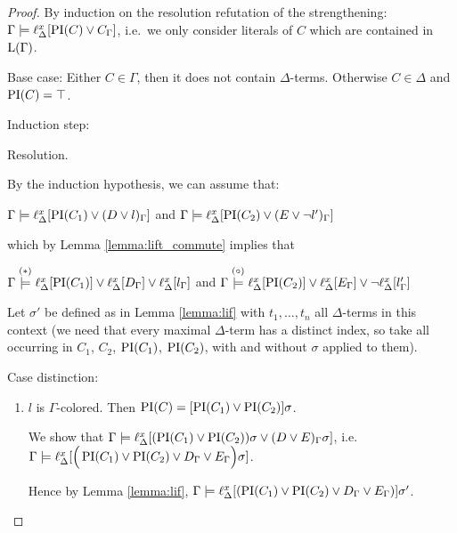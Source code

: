 \begin{proof}
	By induction on the resolution refutation of the strengthening: $\Gamma \models \ell_{\Delta}^{x}[\operatorname{PI}(C) \lor C_\Gamma]$, i.e.\ we only consider literals of $C$ which are contained in $\operatorname{L}(\Gamma)$.

	Base case:
	Either $C \in \Gamma$, then it does not contain $\Delta$-terms.
	Otherwise $C \in \Delta$ and $\operatorname{PI}(C) = \top$.

	Induction step:
	\begin{description}
		\item{Resolution.}
			\begin{prooftree}
			\end{prooftree}

			By the induction hypothesis, we can assume that:

			$\Gamma \models \ell_{\Delta}^{x}[\operatorname{PI}(C_1) \lor (D\lor l)_\Gamma]$ and $\Gamma \models \ell_{\Delta}^{x}[\operatorname{PI}(C_2) \lor (E\lor \lnot l')_\Gamma]$

			which by Lemma \ref{lemma:lift_commute} implies that

			$\Gamma \stackrel{(*)}{\models} \ell_{\Delta}^{x}[\operatorname{PI}(C_1)] \lor \ell_{\Delta}^{x}[D_\Gamma] \lor \ell_{\Delta}^{x}[l_\Gamma]$ and $\Gamma \stackrel{(\circ)}{\models} \ell_{\Delta}^{x}[\operatorname{PI}(C_2)] \lor \ell_{\Delta}^{x}[E_\Gamma] \lor \lnot \ell_{\Delta}^{x}[l'_\Gamma]$

			Let $\sigma'$ be defined as in Lemma \ref{lemma:lif} with $t_1, \ldots, t_n$ all $\Delta$-terms in this context (we need that every maximal $\Delta$-term has a distinct index, so take all occurring in $C_1$, $C_2$, $\operatorname{PI}(C_1)$, $\operatorname{PI}(C_2)$, with and without $\sigma$ applied to them).

			Case distinction:

			\begin{enumerate}
				\item $l$ is $\Gamma$-colored.
					Then $\operatorname{PI}(C) = [\operatorname{PI}(C_1) \lor \operatorname{PI}(C_2)]\sigma$. 

					We show that $\Gamma \models \ell_{\Delta}^{x}[ (\operatorname{PI}(C_1) \lor \operatorname{PI}(C_2))\sigma \lor (D \lor E)_\Gamma\sigma]$,
					\newline 
					i.e.~$\Gamma \models \ell_{\Delta}^{x}[ \Big(\operatorname{PI}(C_1) \lor \operatorname{PI}(C_2) \lor D_\Gamma \lor E_\Gamma\Big)\sigma] $.


					Hence by Lemma \ref{lemma:lif},
					$\Gamma \models \ell_{\Delta}^{x}[(\operatorname{PI}(C_1) \lor \operatorname{PI}(C_2) \lor D_\Gamma \lor E_\Gamma)]\sigma' $.


\end{enumerate}
\end{description}
\end{proof}
